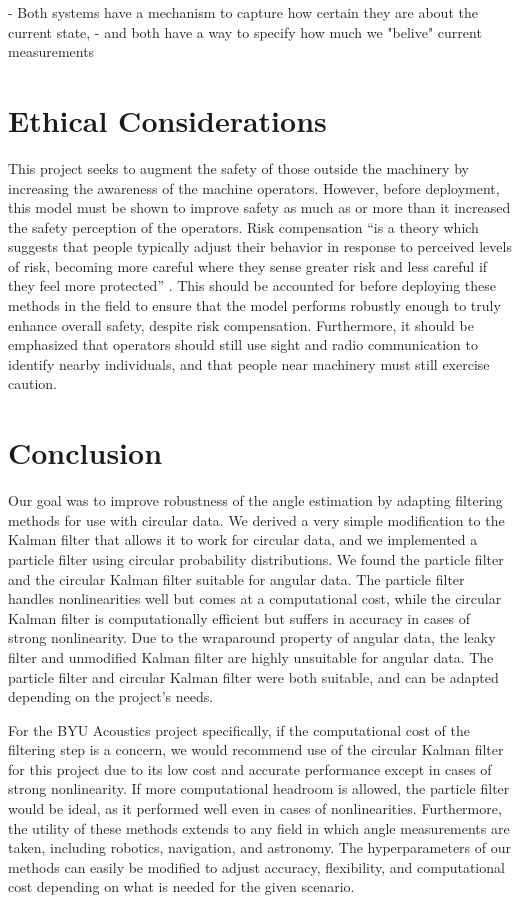 \documentclass[11pt]{amsart}
\begin{document}
- Both systems have a mechanism to capture how certain they are about the current state,
- and both have a way to specify how much we "belive" current measurements

\section{Ethical Considerations}
This project seeks to augment the safety of those outside the machinery by increasing the awareness of the machine operators. However, before deployment, this model must be 
shown to improve safety as much as or more than it increased the safety perception of the operators. Risk compensation “is a theory which suggests that people typically adjust 
their behavior in response to perceived levels of risk, becoming more careful where they sense greater risk and less careful if they feel more protected” \cite{Risk}. This should 
be accounted for before deploying these methods in the field to ensure that the model performs robustly enough to truly enhance overall safety, despite risk compensation. Furthermore, 
it should be emphasized that operators should still use sight and radio communication to identify nearby individuals, and that people near machinery must still exercise caution. 

\section{Conclusion}
Our goal was to improve robustness of the angle estimation by adapting filtering methods for use with circular data. We derived a very simple modification to the Kalman filter that 
allows it to work for circular data, and we implemented a particle filter using circular probability distributions. We found the particle filter and the circular Kalman filter suitable 
for angular data. The particle filter handles nonlinearities well but comes at a computational cost, while the circular Kalman filter is computationally efficient but suffers in 
accuracy in cases of strong nonlinearity. Due to the wraparound property of angular data, the leaky filter and unmodified Kalman filter are highly unsuitable for angular data. The particle 
filter and circular Kalman filter were both suitable, and can be adapted depending on the project’s needs.

For the BYU Acoustics project specifically, if the computational cost of the filtering step is a concern, we would recommend use of the circular Kalman filter for this project due to its low 
cost and accurate performance except in cases of strong nonlinearity. If more computational headroom is allowed, the particle filter would be ideal, as it performed well even in cases of 
nonlinearities. Furthermore, the utility of these methods extends to any field in which angle measurements are taken, including robotics, navigation, and astronomy. The hyperparameters of our 
methods can easily be modified to adjust accuracy, flexibility, and computational cost depending on what is needed for the given scenario. 
\end{document}
